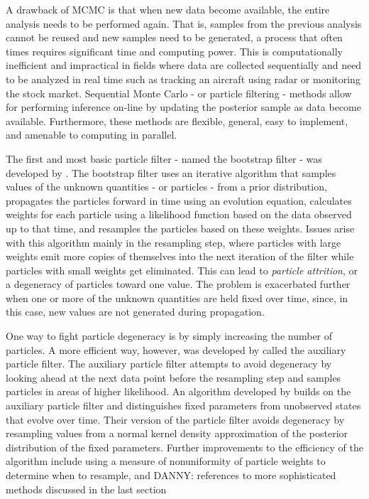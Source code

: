 \documentclass{elsarticle}
\newcommand{\danny}[1]{{\color{blue}DANNY: #1}}
\begin{document}
A drawback of MCMC is that when new data become available, the entire analysis needs to be performed again.  That is, samples from the previous analysis cannot be reused and new samples need to be generated, a process that often times requires significant time and computing power.  This is computationally inefficient and impractical in fields where data are collected sequentially and need to be analyzed in real time such as tracking an aircraft using radar or monitoring the stock market.  Sequential Monte Carlo - or particle filtering - methods allow for performing inference on-line by updating the posterior sample as data become available.  Furthermore, these methods are flexible, general, easy to implement, and amenable to computing in parallel.

The first and most basic particle filter - named the bootstrap filter - was developed by \citet{Gord:Salm:Smit:nove:1993}.  The bootstrap filter uses an iterative algorithm that samples values of the unknown quantities - or particles - from a prior distribution, propagates the particles forward in time using an evolution equation, calculates weights for each particle using a likelihood function based on the data observed up to that time, and resamples the particles based on these weights.  Issues arise with this algorithm mainly in the resampling step, where particles with large weights emit more copies of themselves into the next iteration of the filter while particles with small weights get eliminated.  This can lead to \emph{particle attrition}, or a degeneracy of particles toward one value.  The problem is exacerbated further when one or more of the unknown quantities are held fixed over time, since, in this case, new values are not generated during propagation.

One way to fight particle degeneracy is by simply increasing the number of particles.  A more efficient way, however, was developed by \citet{Pitt:Shep:filt:1999} called the auxiliary particle filter.  The auxiliary particle filter attempts to avoid degeneracy by looking ahead at the next data point before the resampling step and samples particles in areas of higher likelihood.  An algorithm developed by \citet{Liu:West:comb:2001} builds on the auxiliary particle filter and distinguishes fixed parameters from unobserved states that evolve over time.  Their version of the particle filter avoids degeneracy by resampling values from a normal kernel density approximation of the posterior distribution of the fixed parameters.  Further improvements to the efficiency of the algorithm include using a measure of nonuniformity of particle weights to determine when to resample, and \danny{references to more sophisticated methods discussed in the last section}
\end{document}
